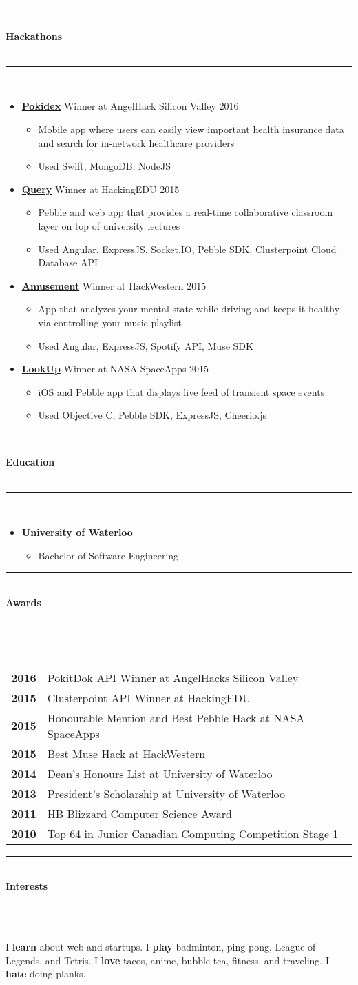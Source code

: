 \documentclass[10pt]{article}
\newcommand{\cvsectiontitle}[1]{%
	\rule{\linewidth}{0.2mm}\\%
		{\large\indent\textbf{#1}}\\%
	\\[-6.5mm]\rule{\linewidth}{0.2mm}\\[2mm]%
	}
\newcommand{\cvhackathonproject}[4]{\href{#2}{\textbf{#1}} {#3} \color{BrickRed}\textit{#4} \color{Black}}
\newcommand{\cveducation}[2]{\textbf{#1} \hspace{\stretch{3}}{#2}}
\newcommand{\cvaward}[2]{\textbf{#1} & {#2}}
\newcommand{\cvsublevel}[1]{\begin{itemize}[leftmargin=0.5cm] #1\end{itemize}}
\newcommand{\cvsubbullet}[1]{\vspace{-1mm}\item #1}
\begin{document}
\vspace{-2.5mm}
\cvsectiontitle{Hackathons}
\vspace{-0.8cm}
\begin{itemize}[leftmargin=0.5cm]
\item \cvhackathonproject{Pokidex}{http://www.hackathon.io/pokidex}{Winner at AngelHack Silicon Valley 2016}{}\cvsublevel{
	\cvsubbullet{Mobile app where users can easily view important health insurance data and search for in-network healthcare providers}
	\cvsubbullet{Used Swift, MongoDB, NodeJS}
}
\item \cvhackathonproject{Query}{http://devpost.com/software/query-sctlva}{Winner at HackingEDU 2015}{}\cvsublevel{
	\cvsubbullet{Pebble and web app that provides a real-time collaborative classroom layer on top of university lectures}
	\cvsubbullet{Used Angular, ExpressJS, Socket.IO, Pebble SDK, Clusterpoint Cloud Database API}
}
\item \cvhackathonproject{Amusement}{http://challengepost.com/software/amusement-um9im}{Winner at HackWestern 2015}{}\cvsublevel{
	\cvsubbullet{App that analyzes your mental state while driving and keeps it healthy via controlling your music playlist}
	\cvsubbullet{Used Angular, ExpressJS, Spotify API, Muse SDK}
}
\item \cvhackathonproject{LookUp}{https://twitter.com/SpaceAppsTO/status/587444439276191744}{Winner at NASA SpaceApps 2015}{}\cvsublevel{
	\cvsubbullet{iOS and Pebble app that displays live feed of transient space events}
	\cvsubbullet{Used Objective C, Pebble SDK, ExpressJS, Cheerio.js}
}
\end{itemize}

\vspace{-2.5mm}
\cvsectiontitle{Education}
\vspace{-0.8cm}
\begin{itemize}[leftmargin=0.5cm]
\item \cveducation{University of Waterloo}{September 2013 - April 2018}\cvsublevel{
	\cvsubbullet{Bachelor of Software Engineering}
}
\end{itemize}

\vspace{-2.5mm}
\cvsectiontitle{Awards}
\begin{tabular}{ c l }
	\cvaward{2016}{PokitDok API Winner at AngelHacks Silicon Valley} \\
	\cvaward{2015}{Clusterpoint API Winner at HackingEDU} \\
	\cvaward{2015}{Honourable Mention and Best Pebble Hack at NASA SpaceApps} \\
	\cvaward{2015}{Best Muse Hack at HackWestern} \\
	\cvaward{2014}{Dean's Honours List at University of Waterloo} \\
	\cvaward{2013}{President's Scholarship at University of Waterloo} \\
	\cvaward{2011}{HB Blizzard Computer Science Award} \\
	\cvaward{2010}{Top 64 in Junior Canadian Computing Competition Stage 1}
\end{tabular}

\vspace{2mm}
\cvsectiontitle{Interests}
I \textbf{learn} about web and startups.
I \textbf{play} badminton, ping pong, League of Legends, and Tetris.
I \textbf{love} tacos, anime, bubble tea, fitness, and traveling.
I \textbf{hate} doing planks.
\end{document}

